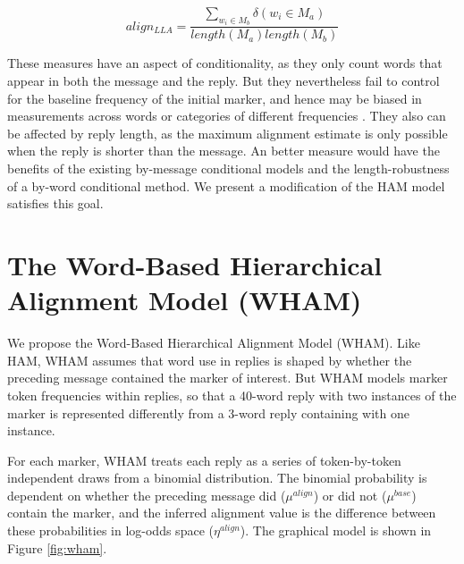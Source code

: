 \documentclass[11pt]{article}
\begin{document}
\begin{equation}
align_{LLA} = \frac{\sum_{w_i \in M_b} \delta(w_i \in M_a)}{length(M_a)length(M_b)}
\end{equation}

These measures have an aspect of conditionality, as they only count words that appear in both the message and the reply. But they nevertheless fail to control for the baseline frequency of the initial marker, and hence may be biased in measurements across words or categories of different frequencies \cite{DoyleYurovskyFrank2016}. They also can be affected by reply length, as the maximum alignment estimate is only possible when the reply is shorter than the message.
An better measure would have the benefits of the existing by-message conditional models and the length-robustness of a by-word conditional method. We present a modification of the HAM model satisfies this goal.

\section{The Word-Based Hierarchical Alignment Model (WHAM)}


We propose the Word-Based Hierarchical Alignment Model (WHAM). Like HAM, WHAM  assumes that word use in replies is shaped by whether the preceding message contained the marker of interest. But WHAM models marker token frequencies within replies, so that a 40-word reply with two instances of the marker is represented differently from a 3-word reply containing with one instance.

For each marker, WHAM treats each reply as a series of token-by-token independent draws from a binomial distribution. The binomial probability is dependent on whether the preceding message did ($\mu^{align}$) or did not ($\mu^{base}$) contain the marker, and the inferred alignment value is the difference between these probabilities in log-odds space ($\eta^{align}$). The graphical model is shown in Figure \ref{fig:wham}.
\end{document}

